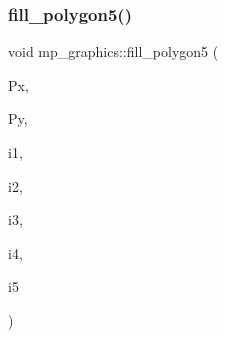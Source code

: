 \mbox{\label{classmp__graphics_a6d1adde8df10147cb4244cf1e65626ef}} 
\subsubsection{\texorpdfstring{fill\+\_\+polygon5()}{fill\_polygon5()}}
{\footnotesize\ttfamily void mp\+\_\+graphics\+::fill\+\_\+polygon5 (\begin{DoxyParamCaption}\item[{\mbox{\hyperlink{galois_8h_a09fddde158a3a20bd2dcadb609de11dc}{I\+NT}} $\ast$}]{Px,  }\item[{\mbox{\hyperlink{galois_8h_a09fddde158a3a20bd2dcadb609de11dc}{I\+NT}} $\ast$}]{Py,  }\item[{\mbox{\hyperlink{galois_8h_a09fddde158a3a20bd2dcadb609de11dc}{I\+NT}}}]{i1,  }\item[{\mbox{\hyperlink{galois_8h_a09fddde158a3a20bd2dcadb609de11dc}{I\+NT}}}]{i2,  }\item[{\mbox{\hyperlink{galois_8h_a09fddde158a3a20bd2dcadb609de11dc}{I\+NT}}}]{i3,  }\item[{\mbox{\hyperlink{galois_8h_a09fddde158a3a20bd2dcadb609de11dc}{I\+NT}}}]{i4,  }\item[{\mbox{\hyperlink{galois_8h_a09fddde158a3a20bd2dcadb609de11dc}{I\+NT}}}]{i5 }\end{DoxyParamCaption})}

\mbox{\label{classmp__graphics_a25bc586443641c2e69e1231373d91ceb}} 

